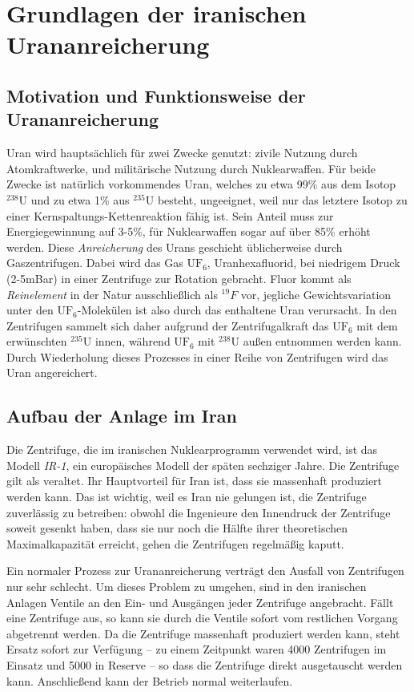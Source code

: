 \documentclass[a4paper]{article}
\begin{document}
\section{Grundlagen der iranischen Urananreicherung}

\subsection{Motivation und Funktionsweise der Urananreicherung}

Uran wird hauptsächlich für zwei Zwecke genutzt: zivile Nutzung durch Atomkraftwerke, und militärische Nutzung durch Nuklearwaffen.
Für beide Zwecke ist natürlich vorkommendes Uran,
welches zu etwa 99\% aus dem Isotop $^{238}\mathrm U$ und zu etwa 1\% aus $^{235}\mathrm U$ besteht, ungeeignet,
weil nur das letztere Isotop zu einer Kernspaltungs-Kettenreaktion fähig ist.
Sein Anteil muss zur Energiegewinnung auf 3-5\%, für Nuklearwaffen sogar auf über 85\% erhöht werden.
Diese \emph{Anreicherung} des Urans geschieht üblicherweise durch Gaszentrifugen.
Dabei wird das Gas $\mathrm{UF}_6$, Uranhexafluorid, bei niedrigem Druck (2-5mBar) in einer Zentrifuge zur Rotation gebracht.
Fluor kommt als \emph{Reinelement} in der Natur ausschließlich als $^{19}F$ vor,
jegliche Gewichtsvariation unter den $\mathrm{UF}_6$-Molekülen ist also durch das enthaltene Uran verursacht.
In den Zentrifugen sammelt sich daher aufgrund der Zentrifugalkraft das $\mathrm{UF}_6$ mit dem erwünschten $^{235}\mathrm U$ innen,
während $\mathrm{UF}_6$ mit $^{238}\mathrm U$ außen entnommen werden kann.
Durch Wiederholung dieses Prozesses in einer Reihe von Zentrifugen wird das Uran angereichert.\cite{wiki:urananreicherung}

\subsection{Aufbau der Anlage im Iran}

Die Zentrifuge, die im iranischen Nuklearprogramm verwendet wird, ist das Modell \emph{IR-1}, ein europäisches Modell der späten sechziger Jahre.
Die Zentrifuge gilt als veraltet. Ihr Hauptvorteil für Iran ist, dass sie massenhaft produziert werden kann.
Das ist wichtig, weil es Iran nie gelungen ist, die Zentrifuge zuverlässig zu betreiben:
obwohl die Ingenieure den Innendruck der Zentrifuge soweit gesenkt haben, dass sie nur noch die Hälfte ihrer theoretischen Maximalkapazität erreicht,
gehen die Zentrifugen regelmäßig kaputt.

Ein normaler Prozess zur Urananreicherung verträgt den Ausfall von Zentrifugen nur sehr schlecht.
Um dieses Problem zu umgehen, sind in den iranischen Anlagen Ventile an den Ein- und Ausgängen jeder Zentrifuge angebracht.
Fällt eine Zentrifuge aus, so kann sie durch die Ventile sofort vom restlichen Vorgang abgetrennt werden.
Da die Zentrifuge massenhaft produziert werden kann, steht Ersatz sofort zur Verfügung
– zu einem Zeitpunkt waren 4000 Zentrifugen im Einsatz und 5000 in Reserve\cite{tkac} – %
so dass die Zentrifuge direkt ausgetauscht werden kann.
Anschließend kann der Betrieb normal weiterlaufen.
\end{document}
